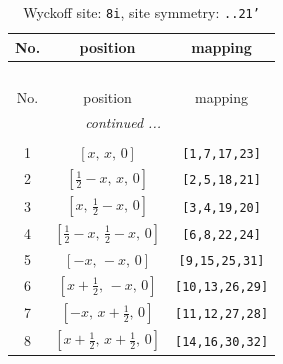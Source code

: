 \documentclass[fleqn,8pt]{jsarticle}
\begin{document}
\renewcommand{\arraystretch}{1.2}
\begin{longtable}{ccc}
\caption{Wyckoff site: {\tt 8i}, site symmetry: {\tt ..21'}}
 \\
 \hline \hline
No. & position & mapping \\ \hline \endfirsthead

\multicolumn{2}{l}{\tablename\ \thetable{}} \\
 \hline \hline
No. & position & mapping \\ \hline \endhead

 \hline \hline
\multicolumn{2}{r}{\footnotesize\it continued ...} \\ \endfoot

 \hline \hline
\multicolumn{2}{r}{} \\ \endlastfoot

1 & $\left[ x,\, x,\, 0 \right]$ & {\tt [1,7,17,23]} \\ \hline
2 & $\left[ \frac{1}{2} - x,\, x,\, 0 \right]$ & {\tt [2,5,18,21]} \\ \hline
3 & $\left[ x,\, \frac{1}{2} - x,\, 0 \right]$ & {\tt [3,4,19,20]} \\ \hline
4 & $\left[ \frac{1}{2} - x,\, \frac{1}{2} - x,\, 0 \right]$ & {\tt [6,8,22,24]} \\ \hline
5 & $\left[ - x,\, - x,\, 0 \right]$ & {\tt [9,15,25,31]} \\ \hline
6 & $\left[ x + \frac{1}{2},\, - x,\, 0 \right]$ & {\tt [10,13,26,29]} \\ \hline
7 & $\left[ - x,\, x + \frac{1}{2},\, 0 \right]$ & {\tt [11,12,27,28]} \\ \hline
8 & $\left[ x + \frac{1}{2},\, x + \frac{1}{2},\, 0 \right]$ & {\tt [14,16,30,32]} \\
\end{longtable}
\renewcommand{\arraystretch}{1.2}
\end{document}
